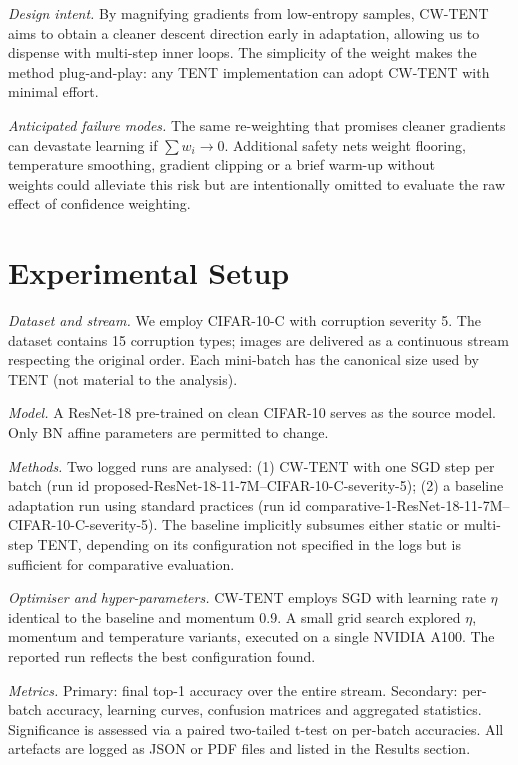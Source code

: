 \documentclass{article} %
\begin{document}
\textit{Design intent.} By magnifying gradients from low-entropy samples, CW-TENT aims to obtain a cleaner descent direction early in adaptation, allowing us to dispense with multi-step inner loops. The simplicity of the weight makes the method plug-and-play: any TENT implementation can adopt CW-TENT with minimal effort.

\textit{Anticipated failure modes.} The same re-weighting that promises cleaner gradients can devastate learning if \(\sum w_i \to 0\). Additional safety netsweight flooring, temperature smoothing, gradient clipping or a brief warm-up without weightscould alleviate this risk but are intentionally omitted to evaluate the raw effect of confidence weighting.

\section{Experimental Setup}
\label{sec:experimental}
\textit{Dataset and stream.} We employ CIFAR-10-C with corruption severity 5. The dataset contains 15 corruption types; images are delivered as a continuous stream respecting the original order. Each mini-batch has the canonical size used by TENT (not material to the analysis).

\textit{Model.} A ResNet-18 pre-trained on clean CIFAR-10 serves as the source model. Only BN affine parameters are permitted to change.

\textit{Methods.} Two logged runs are analysed: (1) CW-TENT with one SGD step per batch (run id proposed-ResNet-18-11-7M--CIFAR-10-C-severity-5); (2) a baseline adaptation run using standard practices (run id comparative-1-ResNet-18-11-7M--CIFAR-10-C-severity-5). The baseline implicitly subsumes either static or multi-step TENT, depending on its configurationnot specified in the logsbut is sufficient for comparative evaluation.

\textit{Optimiser and hyper-parameters.} CW-TENT employs SGD with learning rate \(\eta\) identical to the baseline and momentum 0.9. A small grid search explored \(\eta\), momentum and temperature variants, executed on a single NVIDIA A100. The reported run reflects the best configuration found.

\textit{Metrics.} Primary: final top-1 accuracy over the entire stream. Secondary: per-batch accuracy, learning curves, confusion matrices and aggregated statistics. Significance is assessed via a paired two-tailed t-test on per-batch accuracies. All artefacts are logged as JSON or PDF files and listed in the Results section.
\end{document}
